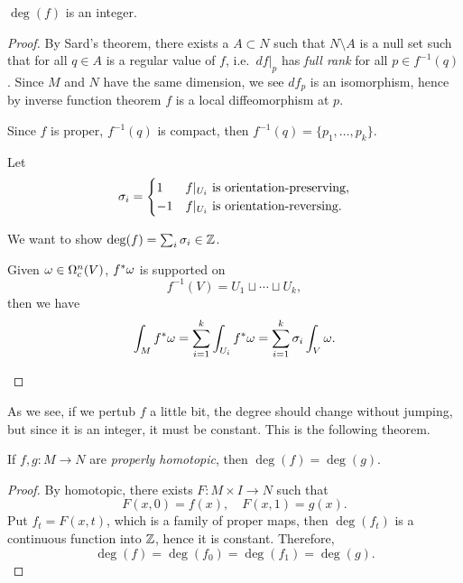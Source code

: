 \begin{proposition}
    \(\deg(f)\) is an integer.
\end{proposition}
\begin{proof}
    By Sard's theorem, there exists a \(A\subset N\) such that \(N\setminus A\) is a null set such that for all \(q\in A\) is a regular value of \(f\), i.e.\ \(df|_p\) has \emph{full rank} for all \(p\in f^{-1}(q)\). Since \(M\) and \(N\) have the same dimension, we see \(df_p\) is an isomorphism, hence by inverse function theorem \(f\) is a local diffeomorphism at \(p\).
    
    Since \(f\) is proper, \(f^{-1}(q)\) is compact, then \(f^{-1}(q) = \{p_1,\ldots,p_k\}\).

    Let \[
        \sigma_i = \begin{cases}
            1 & f|_{U_i} \text{ is orientation-preserving},\\
            -1 & f|_{U_i} \text{ is orientation-reversing}.
        \end{cases}
    \]

    We want to show \(\deg(f) = \sum_i \sigma_i\in\mathbb{Z}\).
    \begin{roof}
        Given \(\omega\in\Omega_c^n(V)\), \(f^*\omega\) is supported on \[
            f^{-1}(V) = U_1\sqcup\cdots\sqcup U_k,
        \] then we have \begin{align*}
            \int_M f^*\omega
            = \sum_{i=1}^k \int_{U_i} f^*\omega
            = \sum_{i=1}^k \sigma_i \int_{V} \omega.
        \end{align*}
    \end{roof}
\end{proof}

As we see, if we pertub \(f\) a little bit, the degree should change without jumping, but since it is an integer, it must be constant. This is the following theorem.
\begin{proposition}
    If \(f,g:M\longrightarrow N\) are \emph{properly homotopic}, then \(\deg(f) = \deg(g)\).
\end{proposition}
\begin{proof}
    By homotopic, there exists \(F:M\times I\longrightarrow N\) such that \[
        F(x,0) = f(x),\quad F(x,1) = g(x).
    \]
    Put \(f_t = F(x,t)\), which is a family of proper maps, then \(\deg(f_t)\) is a continuous function into \(\mathbb{Z}\), hence it is constant. Therefore, \[
        \deg(f) = \deg(f_0) = \deg(f_1) = \deg(g).
    \]
\end{proof}

